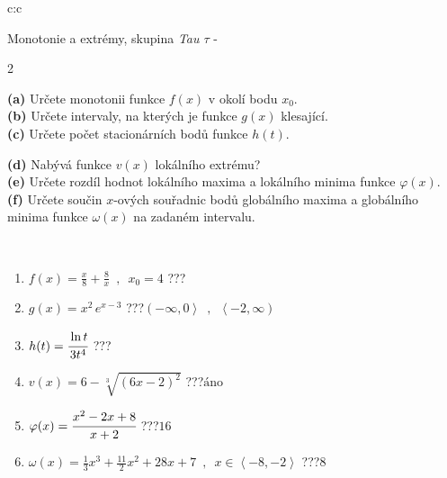 \documentclass[10pt]{report}
\begin{document}
\newpage
\thispagestyle{empty}
\begin{tabular}{c:c}
\begin{minipage}[c][104.5mm][t]{0.5\linewidth}
\begin{center}
\vspace{7mm}
{\huge Monotonie a extrémy, skupina \textit{Tau $\tau$} -}\\[5mm]
\begin{minipage}{0.95\linewidth}
\begin{center}
{\small \begin{multicols}{2} \raggedright
\textbf{(a)} Určete monotonii funkce \(f(x)\) v okolí bodu \(x_0\). \\[1mm]
\textbf{(b)} Určete intervaly, na kterých je funkce \(g(x)\) klesající. \\[1mm]
\textbf{(c)} Určete počet stacionárních bodů funkce \(h(t)\). \par \columnbreak
\textbf{(d)} Nabývá funkce \(v(x)\) lokálního extrému? \\[1mm]
\textbf{(e)} Určete rozdíl hodnot lokálního maxima a lokálního minima funkce \(\varphi(x)\). \\[1mm]
\textbf{(f)} Určete součin \(x\)-ových souřadnic bodů globálního maxima a globálního minima funkce \(\omega(x)\) na zadaném intervalu. \\[1mm]
\end{multicols}
}
\end{center}
\end{minipage}
\\[4mm]
\begin{minipage}{0.79\linewidth}
\begin{center}
\begin{varwidth}{\linewidth}
\begin{enumerate}
\normalsize
\item $f(x)=\frac{x}{8}+\frac{8}{x} \enspace , \enspace x_0=4$\quad \dotfill\; ???\;\dotfill \quad {}
\item $g(x)=x^2\, e^{x-3}$\quad \dotfill\; ???\;\dotfill \quad $\left(-\infty , 0\right\rangle\enspace , \enspace \left\langle-2 , \infty\right)$
\item $h(t)=\cfrac{\ln t}{3t^4}$\quad \dotfill\; ???\;\dotfill {}
\item $v(x)=6-\sqrt[3]{(6x-2)^2}$\quad \dotfill\; ???\;\dotfill \quad $\text{áno}$
\item $\varphi(x)=\cfrac{x^2-2x+8}{x+2}$\quad \dotfill\; ???\;\dotfill \quad $16$
\item $\omega(x)=\frac{1}{3}x^3+\frac{11}{2}x^2+28x+7 \enspace , \enspace x\in\left\langle-8 , -2\right\rangle$\quad \dotfill\; ???\;\dotfill \quad $8$

\end{enumerate}
\end{varwidth}
\end{center}
\end{minipage}
\end{center}
\end{minipage}
\end{tabular}
\end{document}
